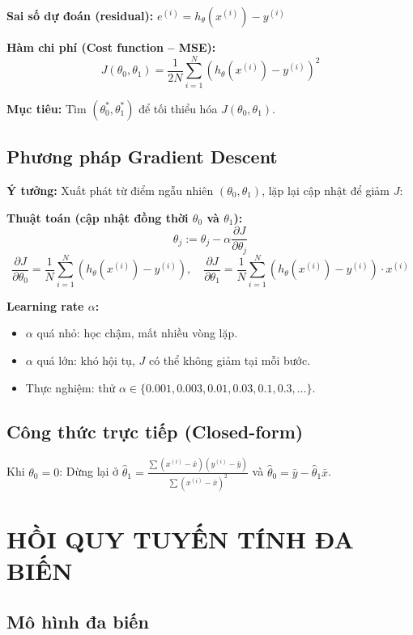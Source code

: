 \documentclass[10pt]{article}
\begin{document}
\textbf{Sai số dự đoán (residual):} $e^{(i)} = h_\theta(x^{(i)}) - y^{(i)}$

\textbf{Hàm chi phí (Cost function -- MSE):}
\[
J(\theta_0, \theta_1) = \frac{1}{2N} \sum_{i=1}^{N} \left(h_\theta(x^{(i)}) - y^{(i)}\right)^2
\]

\textbf{Mục tiêu:} Tìm $(\theta_0^*, \theta_1^*)$ để tối thiểu hóa $J(\theta_0, \theta_1)$.

\subsection{Phương pháp Gradient Descent}

\textbf{Ý tưởng:} Xuất phát từ điểm ngẫu nhiên $(\theta_0, \theta_1)$, lặp lại cập nhật để giảm $J$:

\textbf{Thuật toán (cập nhật đồng thời $\theta_0$ và $\theta_1$):}
\[
\theta_j := \theta_j - \alpha \frac{\partial J}{\partial \theta_j}
\]
\[
\frac{\partial J}{\partial \theta_0} = \frac{1}{N}\sum_{i=1}^{N}(h_\theta(x^{(i)}) - y^{(i)}), \quad
\frac{\partial J}{\partial \theta_1} = \frac{1}{N}\sum_{i=1}^{N}(h_\theta(x^{(i)}) - y^{(i)}) \cdot x^{(i)}
\]

\textbf{Learning rate $\alpha$:}
\begin{itemize}
    \item $\alpha$ quá nhỏ: học chậm, mất nhiều vòng lặp.
    \item $\alpha$ quá lớn: khó hội tụ, $J$ có thể không giảm tại mỗi bước.
    \item Thực nghiệm: thử $\alpha \in \{0.001, 0.003, 0.01, 0.03, 0.1, 0.3, \ldots\}$.
\end{itemize}

\subsection{Công thức trực tiếp (Closed-form)}

Khi $\theta_0 = 0$: Dừng lại ở $\hat{\theta}_1 = \frac{\sum(x^{(i)} - \bar{x})(y^{(i)} - \bar{y})}{\sum(x^{(i)} - \bar{x})^2}$ và $\hat{\theta}_0 = \bar{y} - \hat{\theta}_1 \bar{x}$.

\section{HỒI QUY TUYẾN TÍNH ĐA BIẾN}

\subsection{Mô hình đa biến}
\end{document}
